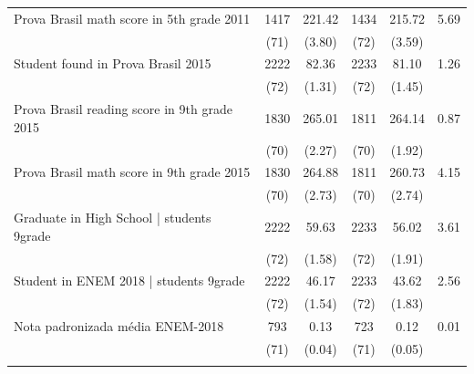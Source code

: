 \documentclass[
	article,			%
	12pt,				%
	oneside,			%
	a4paper,			%
	]{article}
\begin{document}
\begin{table}[h!]
\begin{tabular}{lccccc}
Prova Brasil math score in 5th grade 2011 &       1417 &     221.42 &       1434 &     215.72 &       5.69 \\

           &       (71) &     (3.80) &       (72) &     (3.59) &            \\

Student found in Prova Brasil 2015 &       2222 &      82.36 &       2233 &      81.10 &       1.26 \\

           &       (72) &     (1.31) &       (72) &     (1.45) &            \\

Prova Brasil reading score in 9th grade 2015 &       1830 &     265.01 &       1811 &     264.14 &       0.87 \\

           &       (70) &     (2.27) &       (70) &     (1.92) &            \\

Prova Brasil math score in 9th grade 2015 &       1830 &     264.88 &       1811 &     260.73 &      4.15 \\

           &       (70) &     (2.73) &       (70) &     (2.74) &            \\

Graduate in High School    | students 9grade &       2222 &      59.63 &       2233 &      56.02 &       3.61 \\

           &       (72) &     (1.58) &       (72) &     (1.91) &            \\

Student in ENEM 2018 | students 9grade &       2222 &      46.17 &       2233 &      43.62 &       2.56 \\

           &       (72) &     (1.54) &       (72) &     (1.83) &            \\

Nota padronizada média ENEM-2018 &        793 &       0.13 &        723 &       0.12 &       0.01 \\

           &       (71) &     (0.04) &       (71) &     (0.05) &            \\

           &            &            &            &            &            \\

\hline

\end{tabular}
 \label{tab:balance_adm2}%
\par\vspace{2pt}
\end{table}
\end{document}
